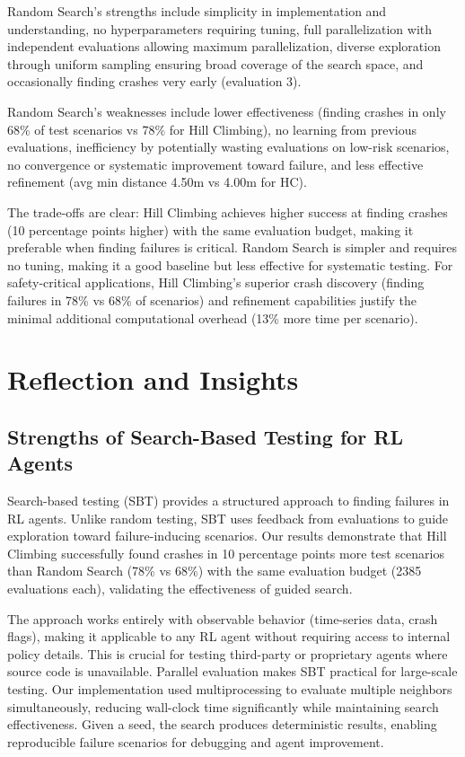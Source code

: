 \documentclass[11pt,a4paper]{article}
\begin{document}
Random Search's strengths include simplicity in implementation and understanding, no hyperparameters requiring tuning, full parallelization with independent evaluations allowing maximum parallelization, diverse exploration through uniform sampling ensuring broad coverage of the search space, and occasionally finding crashes very early (evaluation 3).

Random Search's weaknesses include lower effectiveness (finding crashes in only 68\% of test scenarios vs 78\% for Hill Climbing), no learning from previous evaluations, inefficiency by potentially wasting evaluations on low-risk scenarios, no convergence or systematic improvement toward failure, and less effective refinement (avg min distance 4.50m vs 4.00m for HC).

The trade-offs are clear: Hill Climbing achieves higher success at finding crashes (10 percentage points higher) with the same evaluation budget, making it preferable when finding failures is critical. Random Search is simpler and requires no tuning, making it a good baseline but less effective for systematic testing. For safety-critical applications, Hill Climbing's superior crash discovery (finding failures in 78\% vs 68\% of scenarios) and refinement capabilities justify the minimal additional computational overhead (13\% more time per scenario).

\section{Reflection and Insights}

\subsection{Strengths of Search-Based Testing for RL Agents}

Search-based testing (SBT) provides a structured approach to finding failures in RL agents. Unlike random testing, SBT uses feedback from evaluations to guide exploration toward failure-inducing scenarios. Our results demonstrate that Hill Climbing successfully found crashes in 10 percentage points more test scenarios than Random Search (78\% vs 68\%) with the same evaluation budget (2385 evaluations each), validating the effectiveness of guided search.

The approach works entirely with observable behavior (time-series data, crash flags), making it applicable to any RL agent without requiring access to internal policy details. This is crucial for testing third-party or proprietary agents where source code is unavailable. Parallel evaluation makes SBT practical for large-scale testing. Our implementation used multiprocessing to evaluate multiple neighbors simultaneously, reducing wall-clock time significantly while maintaining search effectiveness. Given a seed, the search produces deterministic results, enabling reproducible failure scenarios for debugging and agent improvement.
\end{document}
